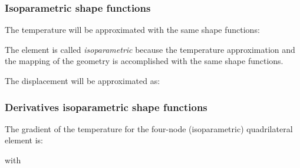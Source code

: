 \documentclass[notes]{beamer}
\begin{document}
\begin{frame}
\frametitle{Isoparametric shape functions}
The temperature will be approximated with the same shape functions:

The element is called \textit{isoparametric} because the temperature approximation and the mapping of the geometry is accomplished with the same shape functions.

The displacement will be approximated as:
\end{frame}

\begin{frame}
\frametitle{Derivatives isoparametric shape functions}
The gradient of the temperature for the four-node (isoparametric) quadrilateral element is:

with
\end{frame}
\end{document}
